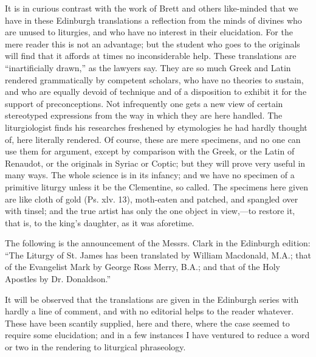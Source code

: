 
It is in curious contrast with the work of Brett and others like-minded that we have in these Edinburgh translations a reflection from the minds of divines who are unused to liturgies, and who have no interest in their elucidation. For the mere reader this is not an advantage; but the student who goes to the originals will find that it affords at times no inconsiderable help. These translations are “inartificially drawn,” as the lawyers say. They are so much Greek and Latin rendered grammatically by competent scholars, who have no theories to sustain, and who are equally devoid of technique and of a disposition to exhibit it for the support of preconceptions. Not infrequently one gets a new view of certain stereotyped expressions from the way in which they are here handled. The liturgiologist finds his researches freshened by etymologies he had hardly thought of, here literally rendered. Of course, these are mere specimens, and no one can use them for argument, except by comparison with the Greek, or the Latin of Renaudot, or the originals in Syriac or Coptic; but they will prove very useful in many ways. The whole science is in its infancy; and we have no specimen of a primitive liturgy unless it be the Clementine, so called. The specimens here given are like cloth of gold (Ps. xlv. 13), moth-eaten and patched, and spangled over with tinsel; and the true artist has only the one object in view,—to restore it, that is, to the king’s daughter, as it was aforetime.

The following is the announcement of the Messrs. Clark in the Edinburgh edition: “The Liturgy of St. James has been translated by William Macdonald, M.A.; that of the Evangelist Mark by George Ross Merry, B.A.; and that of the Holy Apostles by Dr. Donaldson.”

It will be observed that the translations are given in the Edinburgh series with hardly a line of comment, and with no editorial helps to the reader whatever. These have been scantily supplied, here and there, where the case seemed to require some elucidation; and in a few instances I have ventured to reduce a word or two in the rendering to liturgical phraseology.

